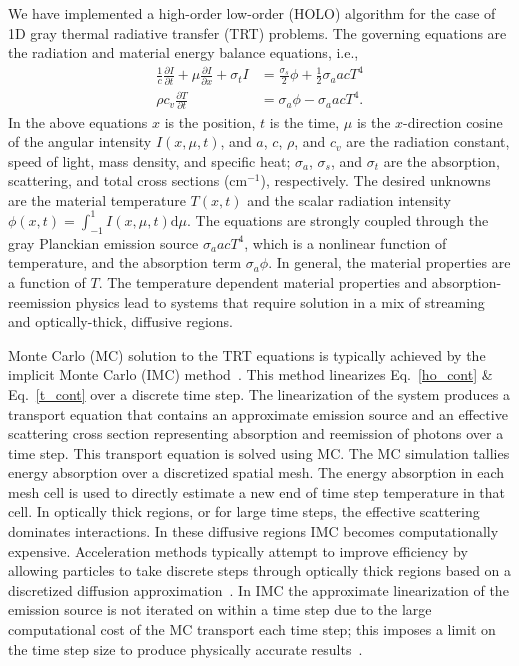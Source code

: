 \documentclass{mc2013}
\newcommand{\pderiv}[2]{\frac{\partial #1}{\partial #2}}
\renewcommand{\d}{\mathrm{d}}
\begin{document}
We have implemented a high-order low-order (HOLO) algorithm for the case of 1D gray thermal radiative transfer (TRT) problems. The governing equations are the radiation and
material energy balance equations, i.e.,\vspace{-0.05in}
\begin{align}\label{ho_cont}
    \frac{1}{c}\pderiv{I}{t} + \mu \pderiv{I}{x} + \sigma_t I
&= \frac{\sigma_s}{2} \phi +\frac{1}{2} \sigma_a a c T^4
    \\ \label{t_cont}
  \rho c_v \pderiv{T}{t} &=  \sigma_a \phi - \sigma_a a c T^4.
\end{align}
In the above equations $x$ is the position, $t$ is the time, $\mu$ is
the $x$-direction cosine of the angular intensity $I(x,\mu,t)$, and $a$, $c$, $\rho$,
and
$c_v$ are the radiation constant, speed of light, mass density, and specific heat; $\sigma_a$, $\sigma_s$, and
$\sigma_t$ are the absorption, scattering, and total
cross sections (cm$^{-1}$), respectively. The desired unknowns are the material
temperature $T(x,t)$ and the scalar radiation intensity $\phi(x,t)=\int_{-1}^1
I(x,\mu,t) \d \mu$. The equations are
strongly coupled through the gray Planckian emission source $\sigma_a a c T^4$, which
is a nonlinear function of temperature, and the absorption
term $\sigma_a \phi$.   In general, the material properties are a function of $T$.  The temperature dependent material properties and
absorption- reemission physics lead to systems that require solution in a mix of
streaming and optically-thick, diffusive regions. 

Monte Carlo (MC) solution to the TRT equations is typically achieved by the 
implicit Monte Carlo (IMC) method~\cite{fnc}. This
method linearizes Eq.~\eqref{ho_cont} \& Eq.~\eqref{t_cont} over a discrete time
step.  The linearization of the system produces a transport equation that contains an approximate emission source and an effective scattering cross section representing
absorption and reemission of photons over a time step. This transport equation is solved using MC. The MC simulation tallies energy absorption
over a discretized spatial mesh.  The energy absorption in each mesh cell is used to directly estimate
a new end of time step temperature in that cell.  In optically thick regions, or for
large time steps, the
effective scattering dominates interactions.  In these diffusive regions IMC
becomes computationally expensive. Acceleration methods typically attempt to improve
efficiency by allowing particles to take discrete steps through optically thick
regions based on a discretized diffusion approximation~\cite{imd,ddmc}. In IMC the
approximate linearization of the emission source is not iterated on within a time
step due to the large computational cost of the MC transport each time step; this
imposes a limit on the time step size to produce physically accurate
results~\cite{wollaber2013discrete}. 
\end{document}
